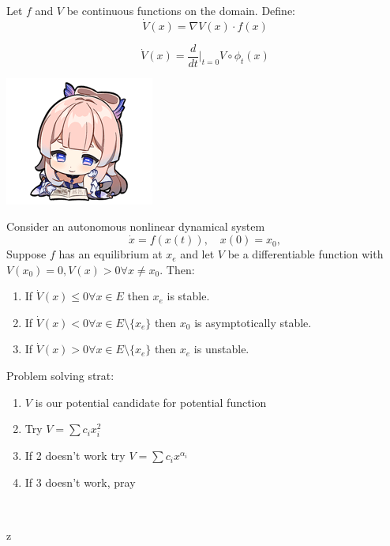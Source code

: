 \documentclass{tufte-book}
\begin{document}
\begin{tcolorbox}[colback=red!5!white]
	Let $f$ and $V$ be continuous functions on the domain. Define:
	$$\dot{V}(x)=\nabla V(x)\cdot f(x)$$
\end{tcolorbox}

\begin{tcolorbox}[colback=blue!8!white]
	$$\dot V(x)=\frac{d}{dt}\Bigg|_{t=0}V\circ \phi_t(x)$$
\end{tcolorbox}

\begin{marginfigure}
	\includegraphics{11.png}
\end{marginfigure}

\begin{tcolorbox}[colback=blue!8!white]
	Consider an autonomous nonlinear dynamical system
$$
\dot{x}=f(x(t)), \quad x(0)=x_0,
$$
Suppose $f$ has an equilibrium at $x_e$ and let $V$ be a differentiable function with $V(x_0)=0, V(x)>0\forall x\ne x_0$. Then:
\begin{enumerate}
	\item If $\dot V(x)\leq 0\forall x\in E$ then $x_e$ is stable.
	\item If $\dot V(x)< 0\forall x\in E\setminus\{x_e\}$ then $x_0$ is asymptotically stable.
	\item If $\dot V(x)> 0\forall x\in E\setminus\{x_e\}$ then $x_e$ is unstable.
\end{enumerate}
\end{tcolorbox}

Problem solving strat:
\begin{enumerate}
	\item $V$ is our potential candidate for potential function
	\item Try $V=\sum c_ix_i^2$
	\item If 2 doesn't work try $V=\sum c_ix^{\alpha_i}$
	\item If 3 doesn't work, pray
\end{enumerate}

\begin{figure}
	\includegraphics[width=0\textwidth]{3-3.jpg}
\end{figure}


\backmatter


z

\end{document}
